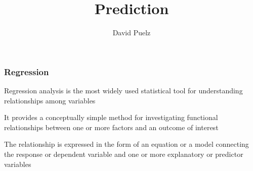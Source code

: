 \documentclass{beamer}
\title[]{\Large{Prediction}\\ \vspace{5mm}}
\subtitle{}
\author{David Puelz \\ \dg{\small The University of Austin}}
\institute[] %
{

}
\date{} %
\newcommand{\bo}[1]{\textcolor{burntorange}{#1}}
\newcommand{\sko}{\vspace{.1in}}
\begin{document}
{
\begin{frame}[noframenumbering]
\vspace{12mm}
\vspace{5mm}
\titlepage %
\end{frame}
}







%	

\begin{frame}
\frametitle{Regression} 


\sko

\bo{Regression analysis} is the most widely used statistical 
tool for understanding relationships among variables \\ \vspace{8mm}

It provides a conceptually simple method for investigating 
functional relationships between one or more factors and 
an outcome of interest \\ \vspace{8mm}

The relationship is expressed in the form of an equation 
or a model connecting the response or dependent 
variable and one or more explanatory or predictor variables


\end{frame}
\end{document}

